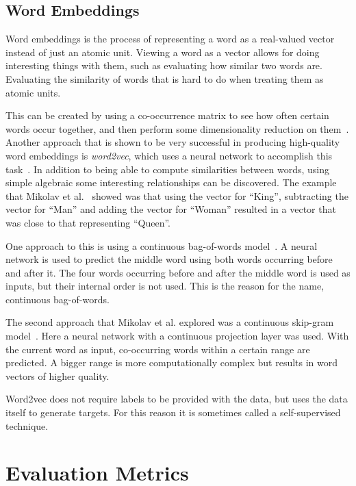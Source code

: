 \subsection{Word Embeddings}

Word embeddings is the process of representing a word as a real-valued vector instead of just an atomic unit.
Viewing a word as a vector allows for doing interesting things with them, such as evaluating how similar two words are.
Evaluating the similarity of words that is hard to do when treating them as atomic units.

This can be created by using a co-occurrence matrix to see how often certain words occur together, and then perform some dimensionality reduction on them~\cite{lebret2013word, levy2014neural}.
Another approach that is shown to be very successful in producing high-quality word embeddings is \textit{word2vec}, which uses a neural network to accomplish this task~\cite{mikolov2013efficient}.
In addition to being able to compute similarities between words, using simple algebraic some interesting relationships can be discovered.
The example that Mikolav et al\@.~\cite{mikolov2013efficient} showed was that using the vector for ``King'', subtracting the vector for ``Man'' and adding the vector for ``Woman'' resulted in a vector that was close to that representing ``Queen''.

One approach to this is using a continuous bag-of-words model~\cite{mikolov2013efficient}.
A neural network is used to predict the middle word using both words occurring before and after it.
The four words occurring before and after the middle word is used as inputs, but their internal order is not used.
This is the reason for the name, continuous bag-of-words.

The second approach that Mikolav et al\@. explored was a continuous skip-gram model~\cite{mikolov2013efficient}.
Here a neural network with a continuous projection layer was used.
With the current word as input, co-occurring words within a certain range are predicted.
A bigger range is more computationally complex but results in word vectors of higher quality.

Word2vec does not require labels to be provided with the data, but uses the data itself to generate targets.
For this reason it is sometimes called a self-supervised technique.

\section{Evaluation Metrics}\label{sec:evaluation-metrics}

